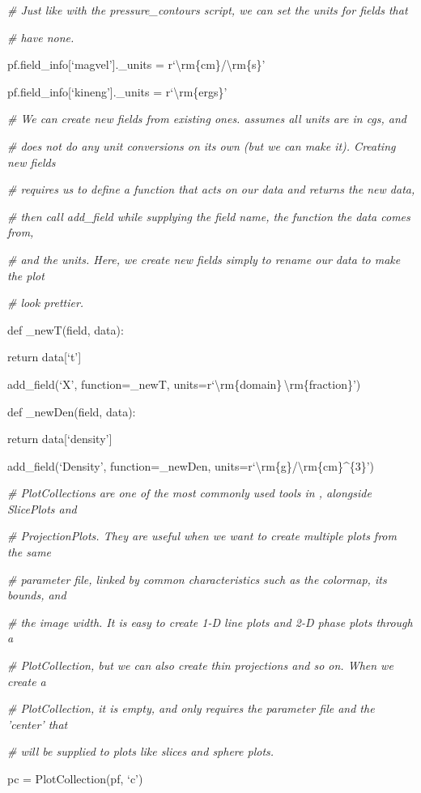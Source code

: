 {\it\# Just like with the pressure\_contours script, we can set the units for fields that}
{\setlength{\parskip}{0pt}

{\it\# have none.}

pf.field\_info[`magvel'].\_units = r`\textbackslash rm\{cm\}/\textbackslash rm\{s\}'
}

pf.field\_info[`kineng'].\_units = r`\textbackslash rm\{ergs\}'

{\it\# We can create new fields from existing ones. \yt assumes all units are in cgs, and}
{\setlength{\parskip}{0pt}

{\it\# does not do any unit conversions on its own (but we can make it). Creating new fields}

{\it\#  requires us to define a function that acts on our data and returns the new data,}

{\it\# then call add\_field while supplying the field name, the function the data comes from,}

{\it\# and the units. Here, we create new fields simply to rename our data to make the plot}

{\it\# look prettier.}

def \_newT(field, data):
}

{\setlength{\parindent}{18.5pt}return data[`t']}

add\_field(`X', function=\_newT, units=r`\textbackslash rm\{domain\}\,\textbackslash rm\{fraction\}')

def \_newDen(field, data):

{\setlength{\parindent}{18.5pt}return data[`density']}

add\_field(`Density', function=\_newDen, units=r`\textbackslash rm\{g\}/\textbackslash rm\{cm\}\^{}\{3\}')

{\it\# PlotCollections are one of the most commonly used tools in \yt, alongside SlicePlots and}
{\setlength{\parskip}{0pt}

{\it\# ProjectionPlots. They are useful when we want to create multiple plots from the same}

{\it\# parameter file, linked by common characteristics such as the colormap, its bounds, and}

{\it\# the image width. It is easy to create 1-D line plots and 2-D phase plots through a}

{\it\# PlotCollection, but we can also create thin projections and so on. When we create a}

{\it\# PlotCollection, it is empty, and only requires the parameter file and the 'center' that}

{\it\# will be supplied to plots like slices and sphere plots.}

pc = PlotCollection(pf, `c')
}

